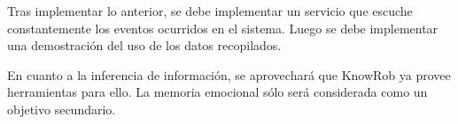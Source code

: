 Tras implementar lo anterior, se debe implementar un servicio que escuche constantemente los eventos ocurridos en el sistema. Luego se debe implementar una demostraci\'on del uso de los datos recopilados.

En cuanto a la inferencia de informaci\'on, se aprovechar\'a que KnowRob ya provee herramientas para ello. La memoria emocional s\'olo ser\'a considerada como un objetivo secundario.








